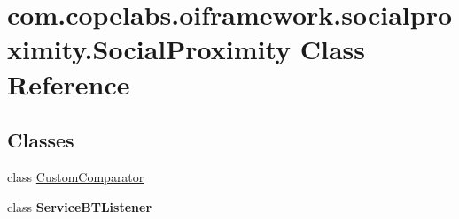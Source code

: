\hypertarget{classcom_1_1copelabs_1_1oiframework_1_1socialproximity_1_1_social_proximity}{}\section{com.\+copelabs.\+oiframework.\+socialproximity.\+Social\+Proximity Class Reference}
\label{classcom_1_1copelabs_1_1oiframework_1_1socialproximity_1_1_social_proximity}
\subsection*{Classes}
\begin{DoxyCompactItemize}
\item 
class \hyperlink{classcom_1_1copelabs_1_1oiframework_1_1socialproximity_1_1_social_proximity_1_1_custom_comparator}{Custom\+Comparator}
\item 
class {\bfseries Service\+B\+T\+Listener}
\end{DoxyCompactItemize}
